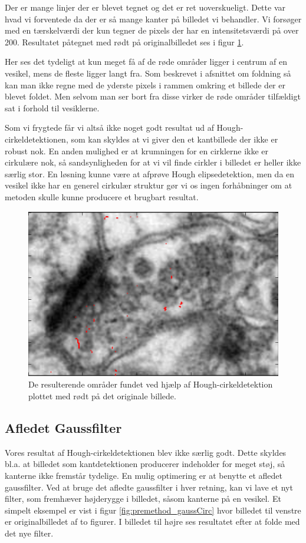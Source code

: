 Der er mange linjer der er blevet tegnet og det er ret uoverskueligt. Dette var hvad vi forventede da der er så mange kanter på billedet vi behandler. Vi forsøger med en tærskelværdi der kun tegner de pixels der har en intensitetsværdi på over 200. Resultatet påtegnet med rødt på originalbilledet ses i figur \ref{fig:premethod_houghCellLinesThresholdOnOrig}.

Her ses det tydeligt at kun meget få af de røde områder ligger i centrum af en vesikel, mens de fleste ligger langt fra. Som beskrevet i afsnittet om foldning så kan man ikke regne med de yderste pixels i rammen omkring et billede der er blevet foldet. Men selvom man ser bort fra disse virker de røde områder tilfældigt sat i forhold til vesiklerne.

Som vi frygtede får vi altså ikke noget godt resultat ud af Hough-cirkeldetektionen, som kan skyldes at vi giver den et kantbillede der ikke er robust nok. En anden mulighed er at krumningen for en cirklerne ikke er cirkulære nok, så sandsynligheden for at vi vil finde cirkler i billedet er heller ikke særlig stor. En løsning kunne være at afprøve Hough elipsedetektion, men da en vesikel ikke har en generel cirkulær struktur gør vi os ingen forhåbninger om at metoden skulle kunne producere et brugbart resultat.

\begin{figure}[H]
	\centering
	\includegraphics[scale=0.8]{files/premethod/img/houghres2.png}
	\caption{De resulterende områder fundet ved hjælp af Hough-cirkeldetektion plottet med rødt på det originale billede.\label{fig:premethod_houghCellLinesThresholdOnOrig}}
\end{figure}

\subsection{Afledet Gaussfilter}
Vores resultat af Hough-cirkeldetektionen blev ikke særlig godt. Dette skyldes bl.a. at billedet som kantdetektionen producerer indeholder for meget støj, så kanterne ikke fremstår tydelige. En mulig optimering er at benytte et afledet gaussfilter. Ved at bruge det afledte gaussfilter i hver retning, kan vi lave et nyt filter, som fremhæver højderygge i billedet, såsom kanterne på en vesikel. Et simpelt eksempel er vist i figur \ref{fig:premethod_gaussCirc} hvor billedet til venstre er originalbilledet af to figurer. I billedet til højre ses resultatet efter at folde med det nye filter.

